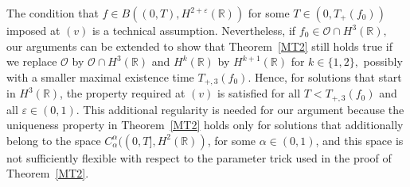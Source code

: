 \documentclass[11pt,reqno]{amsart}
\numberwithin{equation}{section}
\newcommand{\0}{\Omega}
\newcommand{\e}{\varepsilon}
\newcommand{\cO}{\mathcal{O}}
\newcommand{\R}{\mathbb{R}}
\numberwithin{equation}{section}
\begin{document}
 
 The condition that $f\in B((0,T), H^{2+\e}(\R))$ for some $T\in(0,T_+(f_0))$  imposed at $(v)$ is a technical assumption. 
 Nevertheless, if $f_0\in \cO\cap H^3(\R),$   our arguments can be extended to show  that  Theorem~\ref{MT2} still  holds true if we replace $\cO$ by $\cO \cap H^3(\R) $ and $H^k(\R)$ by $H^{k+1}(\R)$ for $k\in\{1,2\},$ 
 possibly with a smaller  maximal existence time  $T_{+,3}(f_0)$. Hence, for solutions that start in $H^3(\R)$, the property required at $(v)$ is satisfied for all $T<T_{+,3}(f_0)$ and all $\e\in(0,1).$
 This additional regularity is needed for our argument because the uniqueness property in Theorem~\ref{MT2} holds  only for solutions that additionally
 belong to the space $C^{\alpha}_{\alpha}((0,T], H^2(\R)) $, for some $\alpha\in(0,1)$, and this space is not
 sufficiently flexible  with respect to the parameter  trick used   in  the proof of Theorem~\ref{MT2}.  
 
 
 
 
\end{document}
